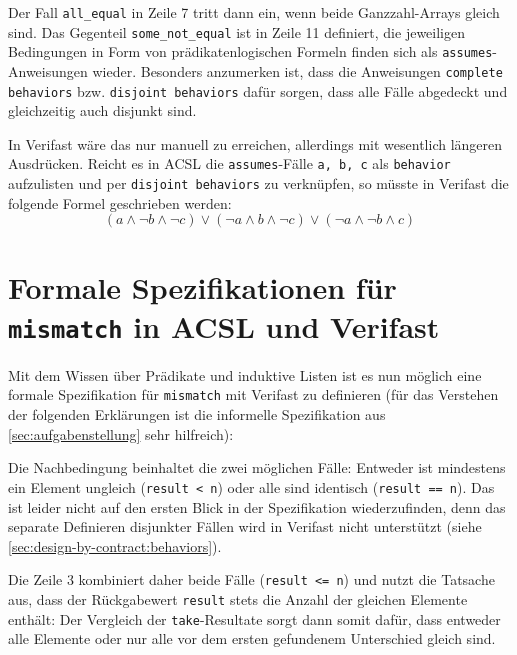 

Der Fall \lstinline{all_equal} in Zeile 7 tritt dann ein, wenn beide Ganzzahl-Arrays gleich sind. Das 
Gegenteil \lstinline{some_not_equal} ist in Zeile 11 definiert, die jeweiligen Bedingungen in Form von
prädikatenlogischen Formeln finden sich als \lstinline{assumes}-Anweisungen wieder. Besonders anzumerken ist,
dass die Anweisungen \lstinline{complete behaviors} bzw. \lstinline{disjoint behaviors} dafür sorgen, dass
alle Fälle abgedeckt und gleichzeitig auch disjunkt sind.

In Verifast wäre das nur manuell zu erreichen, allerdings mit wesentlich längeren Ausdrücken. Reicht 
es in ACSL die \lstinline{assumes}-Fälle \lstinline{a, b, c} als \lstinline{behavior} 
aufzulisten und per \lstinline{disjoint behaviors} zu verknüpfen, so müsste in Verifast die folgende
Formel geschrieben werden:
\[(a \land \neg b \land \neg c) \lor (\neg a \land b \land \neg c) \lor (\neg a \land \neg b \land c)\]


\section{Formale Spezifikationen für \texttt{mismatch} in ACSL und Verifast}

Mit dem Wissen über Prädikate und induktive Listen ist es nun möglich eine formale Spezifikation für \lstinline{mismatch} mit Verifast
zu definieren (für das Verstehen der folgenden Erklärungen ist die informelle Spezifikation aus 
\ref{sec:aufgabenstellung} sehr hilfreich):



Die Nachbedingung beinhaltet die zwei möglichen Fälle: Entweder ist mindestens ein Element ungleich
(\lstinline{result < n}) oder alle sind identisch (\lstinline{result == n}). Das ist leider nicht auf den
ersten Blick in der Spezifikation wiederzufinden, denn das separate Definieren disjunkter Fällen wird in Verifast 
nicht unterstützt (siehe \ref{sec:design-by-contract:behaviors}). 

Die Zeile 3 kombiniert daher beide Fälle (\lstinline{result <= n}) und nutzt die Tatsache aus, dass
der Rückgabewert \lstinline{result} stets die Anzahl der gleichen Elemente enthält: Der Vergleich der
\lstinline{take}-Resultate sorgt dann somit dafür, dass entweder alle Elemente oder nur
alle vor dem ersten gefundenem Unterschied gleich sind. 

